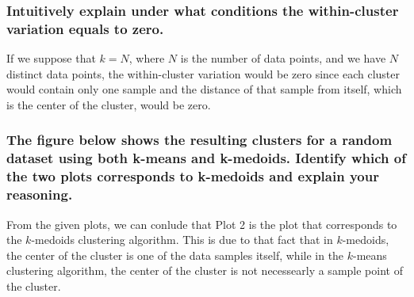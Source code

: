 \documentclass{article}
\begin{document}
\subsubsection{Intuitively explain under what conditions the within-cluster variation equals to zero.}
If we suppose that $k = N$, where $N$ is the number of data points, and we have $N$ distinct data points, the within-cluster variation would be zero since each cluster would contain only one sample and the distance of that sample from itself, which is the center of the cluster, would be zero.

\subsubsection{The figure below shows the resulting clusters for a random dataset using both k-means and k-medoids. Identify which of the two plots corresponds to k-medoids and explain your reasoning.}
From the given plots, we can conlude that Plot 2 is the plot that corresponds to the $k$-medoids clustering algorithm. This is due to that fact that in $k$-medoids, the center of the cluster is one of the data samples itself, while in the $k$-means clustering algorithm, the center of the cluster is not necessearly a sample point of the cluster.

\clearpage

% 
% 

\end{document}
